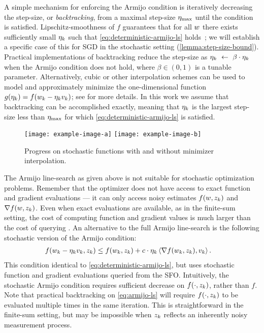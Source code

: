 A simple mechanism for enforcing the Armijo condition is iteratively decreasing the step-size, or \emph{backtracking}, from a maximal step-size \( \eta_{\text{max}} \) until the condition is satisfied.
Lipschitz-smoothness of \( f \) guarantees that for all \( w \) there exists sufficiently small \( \eta_k \) such that \autoref{eq:deterministic-armijo-ls} holds~\citep{nocedal1999numerical}; we will establish a specific case of this for \ac{SGD} in the stochastic setting (\autoref{lemma:step-size-bound}). 
Practical implementations of backtracking reduce the step-size as \( \eta_k~\gets~\beta \cdot \eta_k \) when the Armijo condition does not hold, where \( \beta \in (0,1) \) is a tunable parameter. 
Alternatively, cubic or other interpolation schemes can be used to model and approximately minimize the one-dimensional function \( g(\eta_k) = f(w_k - \eta_k v_k) \); see \citet{nocedal1999numerical} for more details.
In this work we assume that backtracking can be accomplished exactly, meaning that \( \eta_k \) is the largest step-size less than \( \eta_{\text{max}} \) for which \autoref{eq:deterministic-armijo-ls} is satisfied.

\begin{figure}[t]
    \centering
    \texttt{[image: example-image-a]}
    \texttt{[image: example-image-b]}
    \caption{Progress on stochastic functions with and without minimizer interpolation.}%
    \label{fig:interpolation-ls}
\end{figure}

The Armijo line-search as given above is not suitable for stochastic optimization problems.
Remember that the optimizer does not have access to exact function and gradient evaluations --- it can only access noisy estimates \( f(w, z_{k}) \) and \( \nabla f(w, z_{k}) \).
Even when exact evaluations are available, as in the finite-sum setting, the cost of computing function and gradient values is much larger than the cost of querying \oracle{}. 
An alternative to the full Armijo line-search is the following stochastic version of the Armijo condition:
\begin{align}
    f(w_k - \eta_k v_k, z_{k}) &\leq f(w_k, z_{k}) + c \cdot \eta_k \left\langle\nabla f(w_k, z_{k}), v_k\right\rangle. \label{eq:armijo-ls}
\end{align}
This condition identical to \autoref{eq:deterministic-armijo-ls}, but uses stochastic function and gradient evaluations queried from the \ac{SFO}.
Intuitively, the stochastic Armijo condition requires sufficient decrease on \( f(\cdot, z_{k}) \), rather than \( f \).
Note that practical backtracking on \autoref{eq:armijo-ls} will require \( f(\cdot, z_{k}) \) to be evaluated multiple times in the same iteration.
This is straightforward in the finite-sum setting, but may be impossible when \( z_{k} \) reflects an inherently noisy measurement process. 

